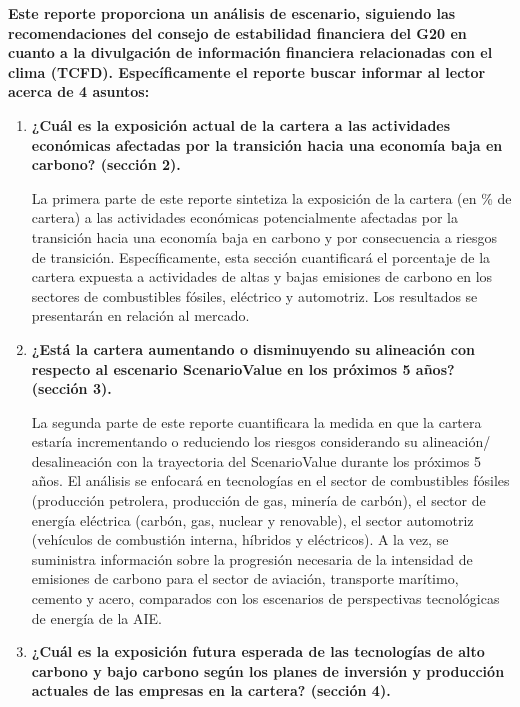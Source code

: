\documentclass[10pt,table]{article}\usepackage[]{graphicx}\usepackage[]{color}
\begin{document}
	\begin{multicols}{2}
		
		\textbf{Este reporte proporciona un análisis de escenario, siguiendo las recomendaciones del consejo de estabilidad financiera del G20 en cuanto a la divulgación de información financiera relacionadas con el clima (TCFD). Específicamente el reporte buscar informar al lector acerca de 4 asuntos: }
		
		\begin{enumerate}
			\item{\textbf{¿Cuál es la exposición actual de la cartera a las actividades económicas afectadas por la transición hacia una economía baja en carbono? (sección 2). }
			}
			
			La primera parte de este reporte sintetiza la exposición de la cartera (en \% de cartera) a las actividades económicas potencialmente afectadas por la transición hacia una economía baja en carbono y por consecuencia a riesgos de transición. Específicamente, esta sección cuantificará el porcentaje de la cartera expuesta a actividades de altas y bajas emisiones de carbono en los sectores de combustibles fósiles, eléctrico y automotriz. Los resultados se presentarán en relación al mercado.
			
			\item{\textbf{¿Está la cartera aumentando o disminuyendo su alineación con respecto al escenario ScenarioValue en los próximos 5 años? (sección 3).}
			}
			
			La segunda parte de este reporte cuantificara la medida en que la cartera estaría incrementando o reduciendo los riesgos considerando su alineación/ desalineación con la trayectoria del ScenarioValue durante los próximos 5 años. El análisis se enfocará en tecnologías en el sector de combustibles fósiles (producción petrolera, producción de gas, minería de carbón), el sector de energía eléctrica (carbón, gas, nuclear y renovable), el sector automotriz (vehículos de combustión interna, híbridos y eléctricos). A la vez, se suministra información sobre la progresión necesaria de la intensidad de emisiones de carbono para el sector de aviación, transporte marítimo, cemento y acero, comparados con los escenarios de perspectivas tecnológicas de energía de la AIE.
			
			
			
			\item{\textbf{¿Cuál es la exposición futura esperada de las tecnologías de alto carbono y bajo carbono según los planes de inversión y producción actuales de las empresas en la cartera? (sección 4).}
			}
			

\end{enumerate}
\end{multicols}
\end{document}
